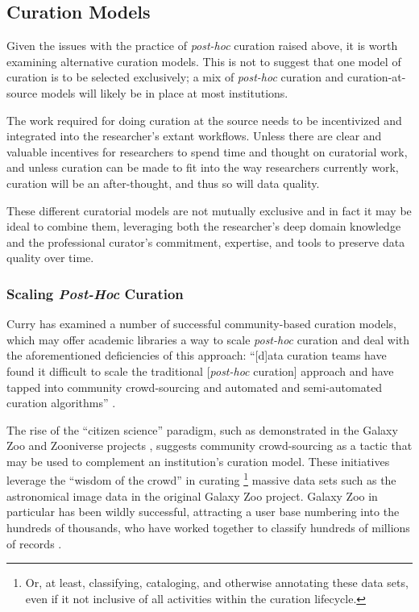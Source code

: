\documentclass[12pt,letterpaper,titlepage,onecolumn,biblatex,backend=biber,style=chicago-authordate]{article}
\begin{document}
\subsection{Curation Models}
Given the issues with the practice of \textit{post-hoc} curation
raised above, it is worth examining alternative curation models. This
is not to suggest that one model of curation is to be selected
exclusively; a mix of \textit{post-hoc} curation and
curation-at-source models will likely be in place at most
institutions.

The work required for doing curation at the source needs to be
incentivized and integrated into the researcher's extant
workflows. Unless there are clear and valuable incentives for
researchers to spend time and thought on curatorial work, and unless
curation can be made to fit into the way researchers currently work,
curation will be an after-thought, and thus so will data quality.

These different curatorial models are not mutually exclusive and in
fact it may be ideal to combine them, leveraging both the researcher's
deep domain knowledge and the professional curator's commitment,
expertise, and tools to preserve data quality over time.

\subsubsection{Scaling \textit{Post-Hoc} Curation}

Curry has examined a number of successful community-based curation
models, which may offer academic libraries a way to scale
\textit{post-hoc} curation and deal with the aforementioned
deficiencies of this approach: ``[d]ata curation teams have found it
difficult to scale the traditional [\textit{post-hoc} curation]
approach and have tapped into community crowd-sourcing and automated
and semi-automated curation algorithms'' \autocite{curry:community}.

The rise of the ``citizen science'' paradigm, such as demonstrated in
the Galaxy Zoo and Zooniverse projects
\autocite{wiki:galaxyzoo,adams:galaxyzoo}, suggests community
crowd-sourcing as a tactic that may be used to complement an
institution's curation model. These initiatives leverage the ``wisdom
of the crowd'' in curating \footnote{Or, at least, classifying,
  cataloging, and otherwise annotating these data sets, even if it not
  inclusive of all activities within the curation lifecycle.}  massive
data sets such as the astronomical image data in the original Galaxy
Zoo project. Galaxy Zoo in particular has been wildly successful,
attracting a user base numbering into the hundreds of thousands, who
have worked together to classify hundreds of millions of records
\autocite{adams:galaxyzoo}.
\end{document}
